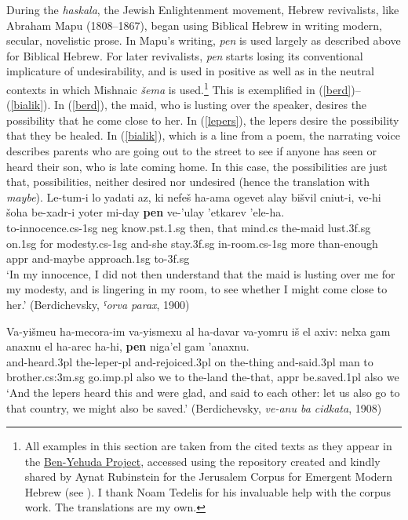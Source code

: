 \documentclass[output=paper,colorlinks,citecolor=brown]{langscibook}
\begin{document}
During the \textit{haskala}, the Jewish Enlightenment movement, Hebrew revivalists, like Abraham Mapu (1808--1867), began using Biblical Hebrew in writing modern, secular, novelistic prose. In Mapu's writing, \textit{pen} is used largely as described above for Biblical Hebrew. For later revivalists, \textit{pen} starts losing its conventional implicature of undesirability, and is used in positive as well as in the neutral contexts in which Mishnaic \textit{šema} is used.\footnote{All examples in this section are taken from the cited texts as they appear in the \href{https://benyehuda.org/}{Ben-Yehuda Project}, accessed using the repository created and kindly shared by Aynat Rubinstein for the Jerusalem Corpus for Emergent Modern Hebrew (see \citealt{rubinstein19}). I thank Noam Tedelis for his invaluable help with the corpus work. The translations are my own.} This is exemplified in (\ref{berd})--(\ref{bialik}). In (\ref{berd}), the maid, who is lusting over the speaker, desires the possibility that he come close to her. In (\ref{lepers}), the lepers desire the possibility that they be healed. In (\ref{bialik}), which is a line from a poem, the narrating voice describes parents who are going out to the street to see if anyone has seen or heard their son, who is late coming home. In this case, the possibilities are just that, possibilities, neither desired nor undesired (hence the translation with \textit{maybe}).
\ea
\label{berd}
\gll  Le-tum-i lo yadati az, ki nefeš ha-ama ogevet alay bišvil cniut-i, ve-hi šoha be-xadr-i yoter mi-day \textbf{pen} ve-'ulay 'etkarev 'ele-ha. \\
to-innocence.{\sc cs-1sg} {\sc neg} know.{\sc pst.1.sg} then, that mind.{\sc cs}  the-maid lust.{\sc 3f.sg} on.{\sc 1sg} for modesty.{\sc cs-1sg} and-she stay.{\sc 3f.sg} in-room.{\sc cs-1sg} more than-enough {\sc appr}  and-maybe approach.{\sc 1sg} to-{\sc 3f.sg} \\
\glt  `In my innocence, I did not then understand that the maid is lusting over me for my modesty, and is lingering in my room, to see whether I might come close to her.' (Berdichevsky, \textit{ˤorva parax}, 1900)
\z

\ea
\label{lepers} 
\gll Va-yišmeu ha-mecora-im va-yismexu al ha-davar va-yomru iš el axiv: nelxa gam anaxnu el ha-arec ha-hi, \textbf{pen} niga'el gam 'anaxnu.\\
and-heard.{\sc 3pl} the-leper-{\sc pl} and-rejoiced.{\sc 3pl} on the-thing and-said.{\sc 3pl} man to brother.{\sc cs:3m.sg} go.{\sc imp.pl} also we to the-land the-that, {\sc appr} be.saved.{\sc 1pl} also we\\
\glt  `And the lepers heard this and were glad, and said to each other: let us also go to that country, we might also be saved.' (Berdichevsky, \textit{ve-anu ba cidkata}, 1908)
\z
\end{document}
